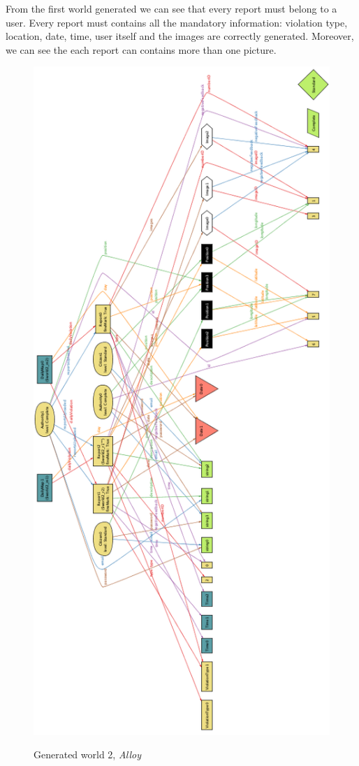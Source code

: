 \documentclass[../RASD.tex]{subfiles}
\begin{document}
    From the first world generated we can see that every report must belong to a user.
    Every report must contains all the mandatory information: violation type, location, date, time, user itself and the images are correctly generated.
    Moreover, we can see the each report can contains more than one picture.

    \begin{figure}[H]
        \centering
        \includegraphics[scale = 0.6]{assets/world2.png}\\
        \caption[Generated world 2, \textit{Alloy}]{Generated world 2, \textit{Alloy}}
    \end{figure}
\end{document}
